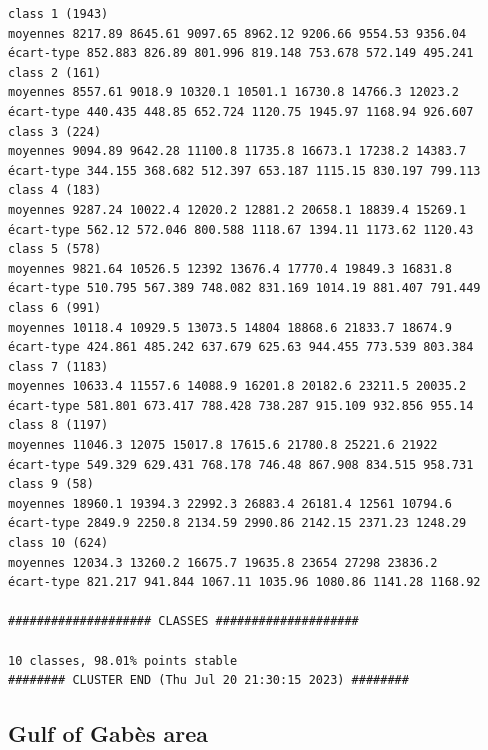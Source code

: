 \documentclass[environments,article,submit,pdftex,moreauthors]{Definitions/mdpi}
\begin{document}
\begin{scriptsize}
\begin{verbatim}
class 1 (1943)
moyennes 8217.89 8645.61 9097.65 8962.12 9206.66 9554.53 9356.04
écart-type 852.883 826.89 801.996 819.148 753.678 572.149 495.241
class 2 (161)
moyennes 8557.61 9018.9 10320.1 10501.1 16730.8 14766.3 12023.2
écart-type 440.435 448.85 652.724 1120.75 1945.97 1168.94 926.607
class 3 (224)
moyennes 9094.89 9642.28 11100.8 11735.8 16673.1 17238.2 14383.7
écart-type 344.155 368.682 512.397 653.187 1115.15 830.197 799.113
class 4 (183)
moyennes 9287.24 10022.4 12020.2 12881.2 20658.1 18839.4 15269.1
écart-type 562.12 572.046 800.588 1118.67 1394.11 1173.62 1120.43
class 5 (578)
moyennes 9821.64 10526.5 12392 13676.4 17770.4 19849.3 16831.8
écart-type 510.795 567.389 748.082 831.169 1014.19 881.407 791.449
class 6 (991)
moyennes 10118.4 10929.5 13073.5 14804 18868.6 21833.7 18674.9
écart-type 424.861 485.242 637.679 625.63 944.455 773.539 803.384
class 7 (1183)
moyennes 10633.4 11557.6 14088.9 16201.8 20182.6 23211.5 20035.2
écart-type 581.801 673.417 788.428 738.287 915.109 932.856 955.14
class 8 (1197)
moyennes 11046.3 12075 15017.8 17615.6 21780.8 25221.6 21922
écart-type 549.329 629.431 768.178 746.48 867.908 834.515 958.731
class 9 (58)
moyennes 18960.1 19394.3 22992.3 26883.4 26181.4 12561 10794.6
écart-type 2849.9 2250.8 2134.59 2990.86 2142.15 2371.23 1248.29
class 10 (624)
moyennes 12034.3 13260.2 16675.7 19635.8 23654 27298 23836.2
écart-type 821.217 941.844 1067.11 1035.96 1080.86 1141.28 1168.92

#################### CLASSES ####################

10 classes, 98.01% points stable
######## CLUSTER END (Thu Jul 20 21:30:15 2023) ########
\end{verbatim}
\end{scriptsize}

\subsection[\appendixname~\thesubsection]{Gulf of Gabès area}
\end{document}
